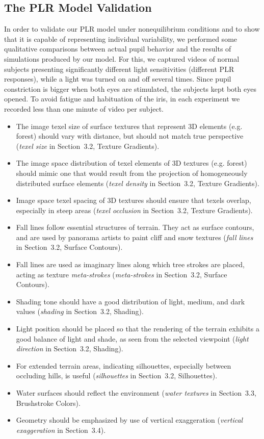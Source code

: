 \documentclass{acmtog}
\begin{document}
\subsection{The PLR Model Validation}
\label{sec:PLRValidation}
%
In order to validate our PLR model under nonequilibrium conditions and to show that it is capable of representing individual variability, we performed some qualitative comparisons between actual pupil behavior and the results of simulations produced by our model. 
For this, we captured videos of normal subjects presenting significantly different light sensitivities (different PLR responses), while a light was turned {on} and {off} several times. 
Since pupil constriction is bigger when both eyes are stimulated, the subjects kept both eyes opened. To avoid fatigue and habituation of the iris, in each experiment we recorded less than one minute of video per subject.
\begin{itemize}
\item The image texel size of surface textures that represent 3D elements (e.g. forest) should vary with distance, but should not match true perspective (\emph{texel size} in Section~3.2, Texture Gradients).
\item The image space distribution of texel elements of 3D textures (e.g. forest) should mimic one that would result from the projection of homogeneously distributed surface elements (\emph{texel density} in Section~3.2, Texture Gradients).
\item Image space texel spacing of 3D textures should ensure that texels overlap, especially in steep areas (\emph{texel occlusion} in 
Section~3.2, Texture Gradients).
\item Fall lines follow essential structures of terrain. They act as surface contours, and are used by panorama artists to paint cliff and snow textures (\emph{fall lines} 
in Section~3.2, Surface Contours).
\item Fall lines are used as imaginary lines along which tree strokes are placed, acting as texture \emph{meta-strokes} (\emph{meta-strokes} in 
Section~3.2, Surface Contours).
\item Shading tone should have a good distribution of light, medium, and dark values (\emph{shading} in Section~3.2, Shading).
\item Light position should be placed so that the rendering of the terrain exhibits a good balance of light and shade, as seen from the selected viewpoint (\emph{light direction} in Section~3.2, Shading).
\item For extended terrain areas, indicating silhouettes, especially between occluding hills, is useful (\emph{silhouettes} in Section~3.2, Silhouettes).
\item Water surfaces should reflect the environment (\emph{water textures} in Section~3.3, Brushstroke Colors).
\item Geometry should be emphasized by use of vertical exaggeration (\emph{vertical exaggeration} in Section~3.4).
\end{itemize}
\end{document}

